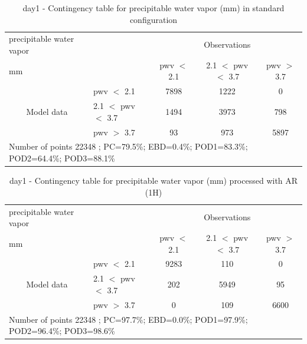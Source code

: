 \begin{table}[p!]
\begin{center}
\begin{tabular}{llccc}
\hline
{precipitable water vapor}                                       &                                                    & \multicolumn{3}{c}{Observations}                 \\
{mm}                                       &                             & pwv $<$ 2.1   & 2.1 $<$ pwv $<$ 3.7 & pwv $>$ 3.7 \\
\hline
\multicolumn{1}{c}{\multirow{3}{*}{Model data}}  & pwv $<$ 2.1             & 7898                & 1222                       & 0              \\
                                                 & 2.1  $<$ pwv $<$ 3.7 & 1494                & 3973                       & 798              \\
                                                 & pwv $>$ 3.7             & 93                & 973                       & 5897              \\
\hline
\multicolumn{5}{l}{ Number of points        22348 ; PC=79.5\%; EBD=0.4\%; POD1=83.3\%; POD2=64.4\%; POD3=88.1\%}                 \\
\end{tabular}
\end{center}
\caption{day1 - Contingency table for  precipitable water vapor (mm) in standard configuration  }
\label{tab:contingencypwvBEF:day1}
\end{table}
\begin{table}[p!]
\begin{center}
\begin{tabular}{llccc}
\hline
{precipitable water vapor}                                       &                                                    & \multicolumn{3}{c}{Observations}                 \\
{mm}                                       &                             & pwv $<$ 2.1   & 2.1 $<$ pwv $<$ 3.7 & pwv $>$ 3.7 \\
\hline
\multicolumn{1}{c}{\multirow{3}{*}{Model data}}  & pwv $<$ 2.1             & 9283                & 110                       & 0              \\
                                                 & 2.1  $<$ pwv $<$ 3.7 & 202                & 5949                       & 95              \\
                                                 & pwv $>$ 3.7             & 0                & 109                       & 6600              \\
\hline 
\multicolumn{5}{l}{ Number of points        22348 ; PC=97.7\%; EBD=0.0\%; POD1=97.9\%; POD2=96.4\%; POD3=98.6\%}
\end{tabular}
\end{center}
\caption{day1 - Contingency table for  precipitable water vapor (mm) processed with AR (1H)  }
\label{tab:contingencypwvAFT:day1}
\end{table}
